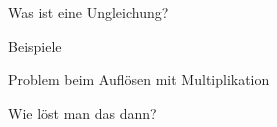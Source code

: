 \documentclass[../../main.tex]{subfiles}
\begin{document}
Was ist eine Ungleichung?

Beispiele

Problem beim Auflösen mit Multiplikation

Wie löst man das dann?
\end{document}
